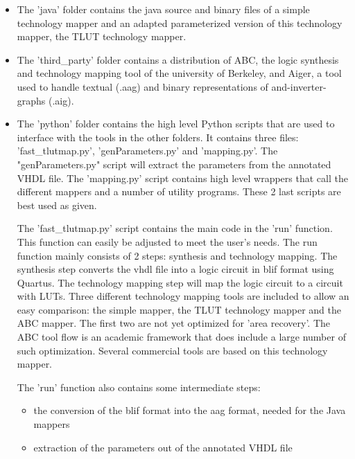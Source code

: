 \documentclass[a4paper,oneside]{memoir}
\begin{document}
\begin{itemize}
\item The 'java' folder contains the java source and binary files of a simple technology mapper and an adapted parameterized version of this technology mapper, the TLUT technology mapper.
\item The 'third\_party' folder contains a distribution of ABC, the logic synthesis and technology mapping tool of the university of Berkeley, and Aiger, a tool used to handle textual (.aag) and binary representations of and-inverter-graphs (.aig).    

\item The 'python' folder contains the high level Python scripts that are used to interface with the tools in the other folders. It contains three files: 'fast\_tlutmap.py', 'genParameters.py' and 'mapping.py'. The "genParameters.py" script will extract the parameters from the annotated VHDL file. The 'mapping.py' script contains high level wrappers that call the different mappers and a number of utility programs. These 2 last scripts are best used as given. 

The 'fast\_tlutmap.py' script contains the main code in the 'run' function. This function can easily be adjusted to meet the user's needs. The run function mainly consists of 2 steps: synthesis and technology mapping. The synthesis step converts the vhdl file into a logic circuit in blif format using Quartus. The technology mapping step will map the logic circuit to a circuit with LUTs. Three different technology mapping tools are included to allow an easy comparison: the simple mapper, the TLUT technology mapper and the ABC mapper. The first two are not yet optimized for 'area recovery'. The ABC tool flow is an academic framework that does include a large number of such optimization. Several commercial tools are based on this technology mapper.

The 'run' function also contains some intermediate steps:
\begin{itemize} 
\item the conversion of the blif format into the aag format, needed for the Java mappers
\item extraction of the parameters out of the annotated VHDL file
\end{itemize}

\end{itemize}

\end{document}

